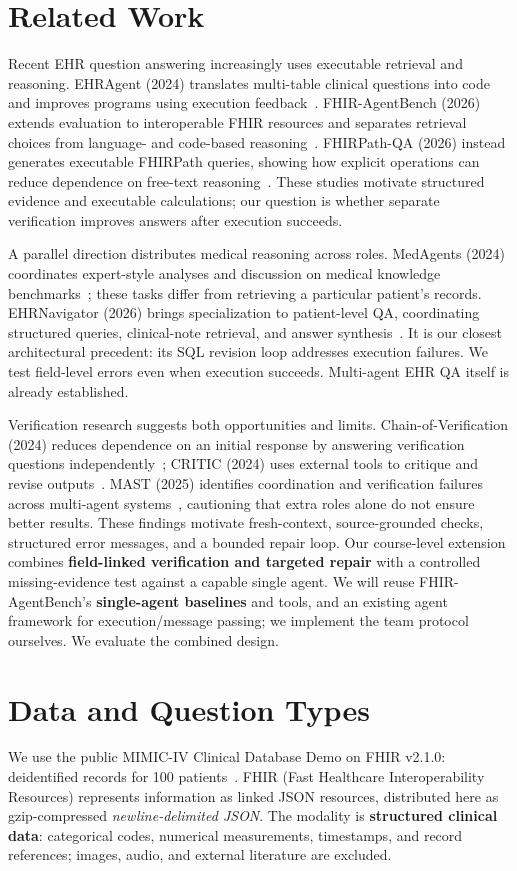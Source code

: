 \documentclass[sigconf,nonacm]{acmart}
\begin{document}
\section{Related Work}
Recent EHR question answering increasingly uses executable retrieval and reasoning. EHRAgent (2024) translates multi-table clinical questions into code and improves programs using execution feedback~\cite{shi2024}. FHIR-AgentBench (2026) extends evaluation to interoperable FHIR resources and separates retrieval choices from language- and code-based reasoning~\cite{lee2026}. FHIRPath-QA (2026) instead generates executable FHIRPath queries, showing how explicit operations can reduce dependence on free-text reasoning~\cite{frew2026}. These studies motivate structured evidence and executable calculations; our question is whether separate verification improves answers after execution succeeds.

A parallel direction distributes medical reasoning across roles. MedAgents (2024) coordinates expert-style analyses and discussion on medical knowledge benchmarks~\cite{tang2024}; these tasks differ from retrieving a particular patient's records. EHRNavigator (2026) brings specialization to patient-level QA, coordinating structured queries, clinical-note retrieval, and answer synthesis~\cite{qian2026}. It is our closest architectural precedent: its SQL revision loop addresses execution failures. We test field-level errors even when execution succeeds. Multi-agent EHR QA itself is already established.

Verification research suggests both opportunities and limits. Chain-of-Verification (2024) reduces dependence on an initial response by answering verification questions independently~\cite{dhuliawala2024}; CRITIC (2024) uses external tools to critique and revise outputs~\cite{gou2024}. MAST (2025) identifies coordination and verification failures across multi-agent systems~\cite{cemri2025}, cautioning that extra roles alone do not ensure better results. These findings motivate fresh-context, source-grounded checks, structured error messages, and a bounded repair loop. Our course-level extension combines \textbf{field-linked verification and targeted repair} with a controlled missing-evidence test against a capable single agent. We will reuse FHIR-AgentBench's \textbf{single-agent baselines} and tools, and an existing agent framework for execution/message passing; we implement the team protocol ourselves. We evaluate the combined design.

\section{Data and Question Types}
We use the public MIMIC-IV Clinical Database Demo on FHIR v2.1.0: deidentified records for 100 patients~\cite{mimicdemo}. FHIR (Fast Healthcare Interoperability Resources) represents information as linked JSON resources, distributed here as gzip-compressed \emph{newline-delimited JSON}. The modality is \textbf{structured clinical data}: categorical codes, numerical measurements, timestamps, and record references; images, audio, and external literature are excluded.
\end{document}
